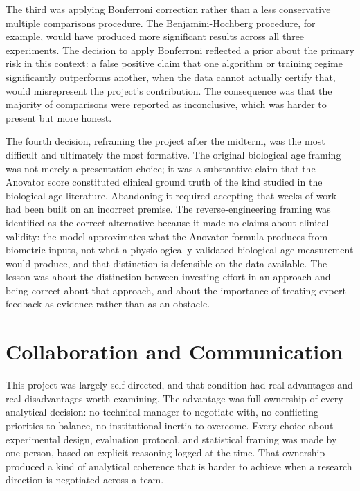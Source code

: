 \documentclass[11pt,a4paper]{report}
\begin{document}
The third was applying Bonferroni correction rather than a less conservative multiple comparisons
procedure. The Benjamini-Hochberg procedure, for example, would have produced more significant
results across all three experiments. The decision to apply Bonferroni reflected a prior about the
primary risk in this context: a false positive claim that one algorithm or training regime
significantly outperforms another, when the data cannot actually certify that, would misrepresent
the project's contribution. The consequence was that the majority of comparisons were reported as
inconclusive, which was harder to present but more honest.

The fourth decision, reframing the project after the midterm, was the most difficult and
ultimately the most formative. The original biological age framing was not merely a presentation
choice; it was a substantive claim that the Anovator score constituted clinical ground truth of the
kind studied in the biological age literature. Abandoning it required accepting that weeks of work
had been built on an incorrect premise. The reverse-engineering framing was identified as the
correct alternative because it made no claims about clinical validity: the model approximates what
the Anovator formula produces from biometric inputs, not what a physiologically validated
biological age measurement would produce, and that distinction is defensible on the data available.
The lesson was about the distinction between investing
effort in an approach and being correct about that approach, and about the importance of treating
expert feedback as evidence rather than as an obstacle.

\section{Collaboration and Communication}

This project was largely self-directed, and that condition had real advantages and real
disadvantages worth examining. The advantage was full ownership of every analytical decision: no
technical manager to negotiate with, no conflicting priorities to balance, no institutional inertia
to overcome. Every choice about experimental design, evaluation protocol, and statistical framing
was made by one person, based on explicit reasoning logged at the time. That ownership produced a
kind of analytical coherence that is harder to achieve when a research direction is negotiated
across a team.
\end{document}
